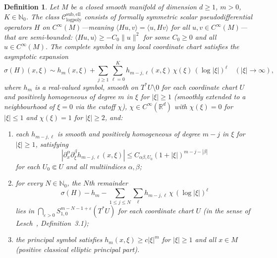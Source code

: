 \documentclass[12pt]{amsart}
\newtheorem{definition}[theorem]{Definition}
\newcommand{\RR}{\mathbb{R}}
\newcommand{\Csub}{\mathcal{C}_{\mathrm{logpoly}}^{\mathrm{sub,ell}}}
\begin{document}
\begin{definition}
\label{def:csub}
Let $M$ be a closed smooth manifold of dimension $d\ge 1$, $m>0$,
$K\in\mathbb{N}_0$.
The class $\Csub$ consists of \emph{formally symmetric} scalar
pseudodifferential operators $H$ on $C^\infty(M)$---meaning
$\langle Hu,v\rangle=\langle u,Hv\rangle$ for all $u,v\in C^\infty(M)$---that
are \emph{semi-bounded}: $\langle Hu,u\rangle\ge -C_0\|u\|^2$ for some
$C_0\ge 0$ and all $u\in C^\infty(M)$.
The complete symbol in any local coordinate chart satisfies the asymptotic expansion
\[
  \sigma(H)(x,\xi)
  \sim
  h_m(x,\xi)
  +
  \sum_{j\ge 1}\sum_{\ell=0}^{K}
    h_{m-j,\ell}(x,\xi)\,\chi(\xi)\,(\log|\xi|)^\ell
  \quad(|\xi|\to\infty),
\]
where $h_m$ is a \emph{real-valued} symbol, smooth on $T^*U\setminus 0$
for each coordinate chart $U$ and positively homogeneous of degree $m$ in
$\xi$ for $|\xi|\ge 1$ (smoothly extended to a neighbourhood of $\xi=0$
via the cutoff $\chi$), $\chi\in C^\infty(\RR^d)$ with $\chi(\xi)=0$ for
$|\xi|\le 1$ and $\chi(\xi)=1$ for $|\xi|\ge 2$, and:
\begin{enumerate}[label=(\roman*)]
  \item each $h_{m-j,\ell}$ is smooth and positively homogeneous of
    degree $m-j$ in $\xi$ for $|\xi|\ge 1$, satisfying
    \[
      |\partial_x^\alpha\partial_\xi^\beta h_{m-j,\ell}(x,\xi)|
      \le C_{\alpha\beta,U_0}(1+|\xi|)^{m-j-|\beta|}
    \]
    for each $U_0\Subset U$ and all multiindices $\alpha,\beta$;
  \item for every $N\in\mathbb{N}_0$, the $N$th remainder
    \[
      \sigma(H)-h_m-\sum_{1\le j\le N}\sum_\ell h_{m-j,\ell}\,\chi\,(\log|\xi|)^\ell
    \]
    lies in $\bigcap_{\varepsilon>0}S^{m-N-1+\varepsilon}_{1,0}(T^*U)$
    for each coordinate chart $U$
    \emph{(in the sense of Lesch~\cite{Lesch1999}, Definition~3.1)};
  \item the principal symbol satisfies $h_m(x,\xi)\ge c|\xi|^m$ for
    $|\xi|\ge 1$ and all $x\in M$
    (\emph{positive classical elliptic principal part}).
\end{enumerate}
\end{definition}
\end{document}
